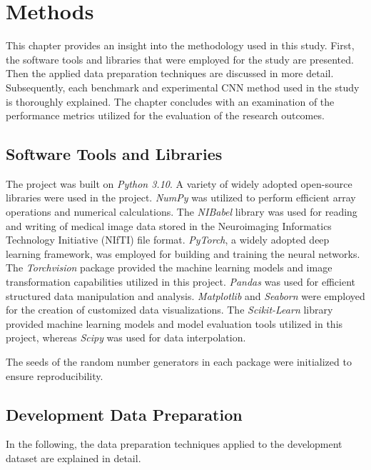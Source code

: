 \section{Methods}
\label{sec:methods}

This chapter provides an insight into the methodology used in this study.
First, the software tools and libraries that were employed for the study are presented.
Then the applied data preparation techniques are discussed in more detail.
Subsequently, each benchmark and experimental CNN method used in the study is thoroughly explained.
The chapter concludes with an examination of the performance metrics 
utilized for the evaluation of the research outcomes.

\subsection{Software Tools and Libraries}
\label{subsec:libs}


The project was built on \textit{Python 3.10}.
A variety of widely adopted open-source libraries were used in the project.
\textit{NumPy} was utilized to perform efficient array operations and numerical calculations.
The \textit{NIBabel} library was used for reading and writing of medical image data stored in the
Neuroimaging Informatics Technology Initiative (NIfTI) file format.
\textit{PyTorch}, a widely adopted deep learning framework, was employed for building 
and training the neural networks.
The \textit{Torchvision} package provided the machine learning models and image transformation capabilities 
utilized in this project.
\textit{Pandas} was used for efficient structured data manipulation and analysis.
\textit{Matplotlib} and \textit{Seaborn} were employed for the creation of customized data visualizations.
The \textit{Scikit-Learn} library provided machine learning models and model evaluation tools utilized in this project, 
whereas \textit{Scipy} was used for data interpolation.

The seeds of the random number generators in each package were initialized to ensure reproducibility.

\subsection{Development Data Preparation}

In the following, the data preparation techniques applied to the development dataset are explained in detail.

